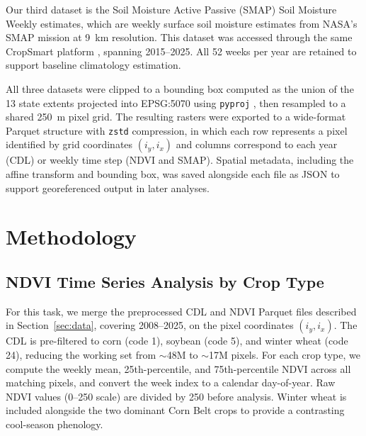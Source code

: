 \documentclass{article}
\begin{document}
Our third dataset is the Soil Moisture Active Passive (SMAP) Soil Moisture Weekly estimates, which are weekly surface soil moisture estimates from NASA's SMAP mission at 9~km resolution. This dataset was accessed through the same CropSmart platform \cite{smap_cropsmart}, spanning 2015--2025. All 52 weeks per year are retained to support baseline climatology estimation.

All three datasets were clipped to a bounding box computed as the union of the 13 state extents projected into EPSG:5070 using \texttt{pyproj} \cite{pyproj}, then resampled to a shared 250~m pixel grid. The resulting rasters were exported to a wide-format Parquet structure \cite{pyarrow} with \texttt{zstd} compression, in which each row represents a pixel identified by grid coordinates $(i_y, i_x)$ and columns correspond to each year (CDL) or weekly time step (NDVI and SMAP). Spatial metadata, including the affine transform and bounding box, was saved alongside each file as JSON to support georeferenced output in later analyses.


\section{Methodology}
\label{sec:methodology}
\subsection{NDVI Time Series Analysis by Crop Type}
\label{sec:time_series}
For this task, we merge the preprocessed CDL and NDVI Parquet files described in Section~\ref{sec:data}, covering 2008--2025, on the pixel coordinates $(i_y, i_x)$. The CDL is pre-filtered to corn (code 1), soybean (code 5), and winter wheat (code 24), reducing the working set from $\sim$48M to $\sim$17M pixels. For each crop type, we compute the weekly mean, 25th-percentile, and 75th-percentile NDVI across all matching pixels, and convert the week index to a calendar day-of-year. Raw NDVI values (0--250 scale) are divided by 250 before analysis. Winter wheat is included alongside the two dominant Corn Belt crops to provide a contrasting cool-season phenology.
\end{document}
